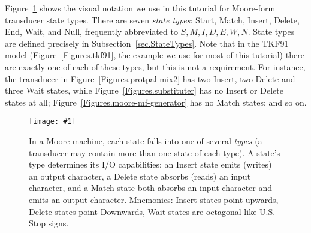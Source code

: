 \documentclass{article}
\newcommand{\secref}[1]{Subsection~\ref{sec.#1}}
\newcommand{\figref}[1]{Figure~\ref{Figures.#1}}
\newcommand{\figlabel}[1]{\label{Figures.#1}}
\newcommand{\easyfig}[4]{
\begin{figure}
\texttt{[image: \#1]}
\caption{ \figlabel{#3} #4}
\end{figure}}
\newcommand{\widepdffig}[2]{\easyfig{#1-fig.pdf}{width=\textwidth}{#1}{#2}}
\begin{document}
\figref{legend} shows the visual notation we use in this tutorial for Moore-form transducer state types.
There are seven {\em state types}: Start, Match, Insert, Delete, End, Wait, and Null, frequently abbreviated to $S,M,I,D,E,W,N$.
State types are defined precisely in \secref{StateTypes}.
Note that in the TKF91 model (\figref{tkf91}, the example we use for most of this tutorial)
there are exactly one of each of these types, but this is not a requirement.
For instance,
the transducer in \figref{protpal-mix2} has two Insert, two Delete and three Wait states,
while \figref{substituter} has no Insert or Delete states at all;
\figref{moore-mf-generator} has no Match states; and so on.

\widepdffig{legend}{In a Moore machine, each state falls into one of several {\em types} (a transducer may contain more than one state of each type).  
A state's type determines its I/O capabilities:
 an Insert state emits (writes) an output character,
 a Delete state absorbs (reads) an input character,
and
 a Match state both absorbs an input character and emits an output character.
Mnemonics: Insert states point upwards, Delete states point Downwards, Wait states are octagonal like U.S. Stop signs.
}
\end{document}
